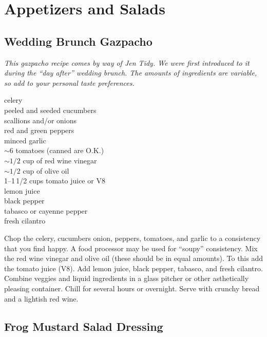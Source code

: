 \chapter{Appetizers and Salads}

\section{Wedding Brunch Gazpacho}

\textit{This gazpacho recipe comes by way of Jen Tidy.  
We were first introduced 
to it during the ``day
after'' wedding brunch.  The amounts of ingredients are variable, so add to your
personal taste preferences.} 
\begin{ingredients}
celery \\
peeled and seeded cucumbers \\
scallions and/or onions \\
red and green peppers \\
minced garlic \\
$\sim 6$ tomatoes (canned are O.K.) \\
$\sim 1/2$ cup of red wine vinegar \\
$\sim 1/2$ cup of olive oil \\
1--1\,1/2 cups tomato juice or V8 \\
lemon juice \\
black pepper \\
tabasco or cayenne pepper \\
fresh cilantro
\end{ingredients}
Chop the celery, cucumbers onion, peppers, tomatoes, and garlic to a
consistency that you find happy.  A food processor may be used for ``soupy''
consistency.  Mix the red wine vinegar and olive oil (these should be in equal
amounts).  To this add the tomato juice (V8).  Add lemon juice, black pepper,
tabasco, and fresh cilantro.  Combine veggies and liquid ingredients in a glass
pitcher or other asthetically pleasing container.  Chill for several hours or
overnight.  Serve with crunchy bread and a lightish red wine.

\section{Frog Mustard Salad Dressing}

